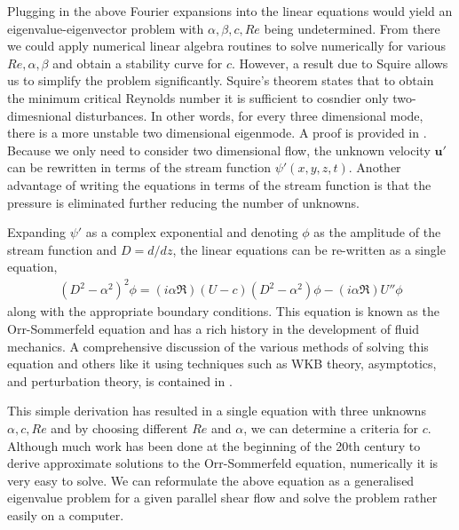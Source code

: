 Plugging in the above Fourier expansions into the linear equations would yield an eigenvalue-eigenvector problem with $\alpha,\beta,c,Re$ being undetermined. From there we could apply numerical linear algebra routines to solve numerically for various $Re,\alpha,\beta$ and obtain a stability curve for $c$. However, a result due to Squire allows us to simplify the problem significantly. Squire's theorem states that to obtain the minimum critical Reynolds number it is sufficient to cosndier only two-dimesnional disturbances\cite{drazinreid}. In other words, for every three dimensional mode, there is a more unstable two dimensional eigenmode. A proof is provided in \cite{drazinreid}.  Because we only need to consider two dimensional flow, the unknown velocity $\bm{u}'$ can be rewritten in terms of the stream function $\psi'(x,y,z,t)$. Another advantage of writing the equations in terms of the stream function is that the pressure is eliminated further reducing the number of unknowns. 

Expanding $\psi'$ as a complex exponential and denoting $\phi$ as the amplitude of the stream function and $D=d/dz$, the linear equations can be re-written as a single equation, 
\begin{align}
(D^{2}-\alpha^{2})^{2}\phi = (i\alpha \Re)(U-c)(D^{2}-\alpha^{2})\phi -(i\alpha \Re)U''\phi
\end{align}
along with the appropriate boundary conditions. This equation is known as the Orr-Sommerfeld equation and has a rich history in the development of fluid mechanics. A comprehensive discussion of the various methods of solving this equation and others like it using techniques such as WKB theory, asymptotics, and perturbation theory, is contained in \cite{drazinreid,vandyke,benderorszag}.

This simple derivation has resulted in a single equation with three unknowns $\alpha,c,Re$ and by choosing different $Re$ and $\alpha$, we can determine a criteria for $c$. Although much work has been done at the beginning of the 20th century to derive approximate solutions to the Orr-Sommerfeld equation, numerically it is very easy to solve. We can reformulate the above equation as a generalised eigenvalue problem for a given parallel shear flow and solve the problem rather easily on a computer\cite{trefethen_spectral}.

